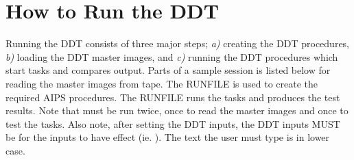 \section{How to Run the DDT}
Running the DDT consists of three major steps;
{\it a)} creating the DDT procedures,
{\it b)} loading the DDT master images, and
{\it c)} running the DDT procedures which start tasks
and compares output.
Parts of a sample \AIPS session is listed
below for reading the master images from tape.
The \AIPS RUNFILE \DDTL is used to create the required AIPS
procedures.  The \AIPS RUNFILE \DDTE runs the \AIPS tasks and
produces the test results.
Note that \DDTE must be run twice, once to read the master images
and once to test the \AIPS tasks.
Also note, after setting the DDT inputs, the DDT inputs MUST
be  for the inputs to have effect (ie. ).
The text the user must type is in lower case.
